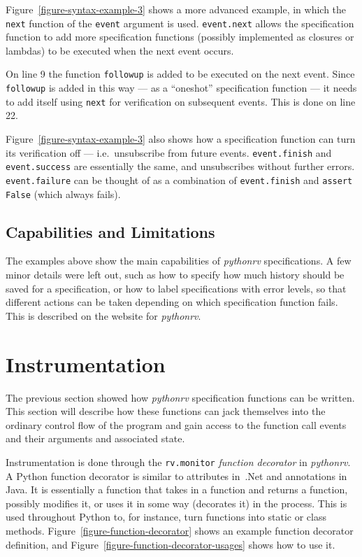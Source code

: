 \documentclass[a4paper,11pt]{kth-mag}
\begin{document}
Figure~\ref{figure-syntax-example-3} shows a more advanced example, in which
the \texttt{next} function of the \texttt{event} argument is used.
\texttt{event.next} allows the specification function to add more specification
functions (possibly implemented as closures or lambdas) to be executed when the
next event occurs.

On line 9 the function \texttt{followup} is added to be executed on the next
event. Since \texttt{followup} is added in this way --- as a ``oneshot''
specification function --- it needs to add itself using \texttt{next} for
verification on subsequent events. This is done on line 22.

Figure~\ref{figure-syntax-example-3} also shows how a specification function
can turn its verification off --- i.e.\ unsubscribe from future events.
\texttt{event.finish} and \texttt{event.success} are essentially the same, and
unsubscribes without further errors. \texttt{event.failure} can be thought of
as a combination of \texttt{event.finish} and \texttt{assert False} (which
always fails).


\subsection{Capabilities and Limitations}

The examples above show the main capabilities of \textit{pythonrv}
specifications. A few minor details were left out, such as how to specify how
much history should be saved for a specification, or how to label
specifications with error levels, so that different actions can be taken
depending on which specification function fails. This is described on the website for
\textit{pythonrv}.


\section{Instrumentation} \label{section-approach-instrumentation}

The previous section showed how \textit{pythonrv} specification functions can
be written. This section will describe how these functions can jack themselves
into the ordinary control flow of the program and gain access to the function
call events and their arguments and associated state.

Instrumentation is done through the \texttt{rv.monitor} \textit{function
decorator} in \textit{pythonrv}. A Python function decorator is similar to
attributes in~.Net and annotations in Java. It is essentially a function that
takes in a function and returns a function, possibly modifies it, or uses it in
some way (decorates it) in the process. This is used throughout Python to, for
instance, turn functions into static or class methods.
Figure~\ref{figure-function-decorator} shows an example function decorator
definition, and Figure~\ref{figure-function-decorator-usages} shows how to use
it.
\end{document}
